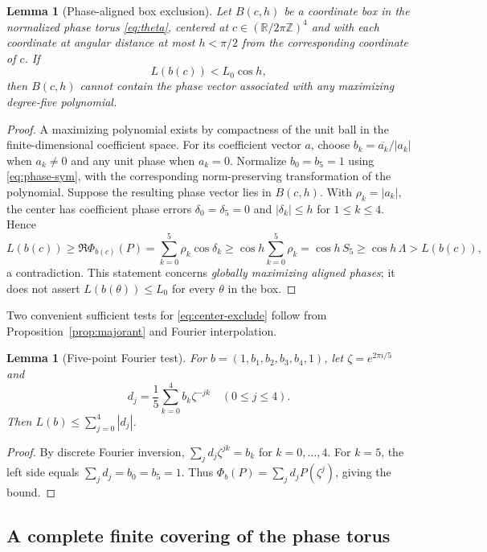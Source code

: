 \documentclass[11pt]{article}
\newtheorem{lemma}[theorem]{Lemma}
\newcommand{\R}{\mathbb R}
\begin{document}
\begin{lemma}[Phase-aligned box exclusion]\label{lem:box-exclude}
Let $B(c,h)$ be a coordinate box in the normalized phase torus \eqref{eq:theta}, centered at $c\in(\R/2\pi\mathbb Z)^4$ and with each coordinate at angular distance at most $h<\pi/2$ from the corresponding coordinate of $c$. If
\begin{equation}\label{eq:center-exclude}
 L(b(c))< L_0\cos h,
\end{equation}
then $B(c,h)$ cannot contain the phase vector associated with any maximizing degree-five polynomial.
\end{lemma}
\begin{proof}
A maximizing polynomial exists by compactness of the unit ball in the finite-dimensional coefficient space. For its coefficient vector $a$, choose $b_k=\overline{a_k}/|a_k|$ when $a_k\ne0$ and any unit phase when $a_k=0$. Normalize $b_0=b_5=1$ using \eqref{eq:phase-sym}, with the corresponding norm-preserving transformation of the polynomial. Suppose the resulting phase vector lies in $B(c,h)$. With $\rho_k=|a_k|$, the center has coefficient phase errors $\delta_0=\delta_5=0$ and $|\delta_k|\le h$ for $1\le k\le4$. Hence
\[
 L(b(c))\ge\Re\Phi_{b(c)}(P)
 =\sum_{k=0}^5\rho_k\cos\delta_k
 \ge\cos h\sum_{k=0}^5\rho_k
 =\cos h\,S_5\ge\cos h\,\Lambda>L(b(c)),
\]
a contradiction. This statement concerns \emph{globally maximizing aligned phases}; it does not assert $L(b(\theta))\le L_0$ for every $\theta$ in the box.
\end{proof}

Two convenient sufficient tests for \eqref{eq:center-exclude} follow from Proposition~\ref{prop:majorant} and Fourier interpolation.

\begin{lemma}[Five-point Fourier test]\label{lem:fourier}
For $b=(1,b_1,b_2,b_3,b_4,1)$, let $\zeta=e^{2\pi i/5}$ and
\begin{equation}\label{eq:dft}
 d_j=\frac15\sum_{k=0}^4b_k\zeta^{-jk}\quad(0\le j\le4).
\end{equation}
Then $L(b)\le\sum_{j=0}^4|d_j|$.
\end{lemma}
\begin{proof}
By discrete Fourier inversion, $\sum_jd_j\zeta^{jk}=b_k$ for $k=0,\ldots,4$. For $k=5$, the left side equals $\sum_jd_j=b_0=b_5=1$. Thus $\Phi_b(P)=\sum_jd_jP(\zeta^j)$, giving the bound.
\end{proof}

\subsection{A complete finite covering of the phase torus}\label{sec:global}
\end{document}
